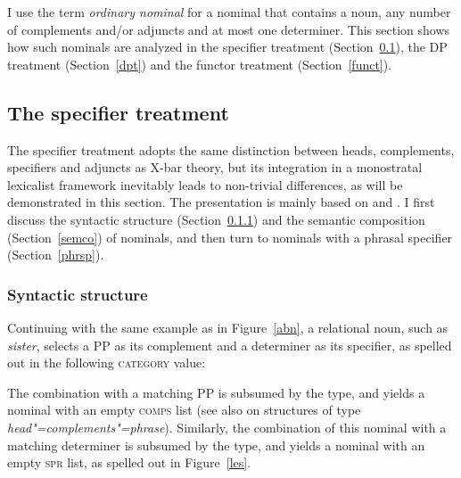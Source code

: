 \documentclass[output=paper,biblatex,babelshorthands,newtxmath,draftmode,colorlinks,citecolor=brown]{langscibook}
\begin{document}
I use the term \emph{ordinary nominal} for a nominal that contains a noun, 
any number of complements and/or adjuncts and at most one determiner. 
This section shows how such nominals are analyzed in the 
specifier treatment (Section~\ref{spect}), the DP treatment (Section~\ref{dpt}) and 
the functor treatment (Section~\ref{funct}). 

    
\subsection{The specifier treatment} 
\label{spect}\label{np:sec-specifier-analysis}


The specifier treatment adopts the same distinction between heads, complements, 
specifiers and adjuncts as X-bar theory, but its integration 
in a monostratal lexicalist framework inevitably leads to non-trivial differences,
as will be demonstrated in this section. 
The presentation is mainly based on \citet{ps2} and \citet{GS00}. 
I first discuss the syntactic structure (Section~\ref{syns}) and the semantic composition (Section~\ref{semco}) 
of nominals, and then turn to nominals with a phrasal specifier (Section~\ref{phrsp}). 


\subsubsection{Syntactic structure}
\label{syns} 

Continuing with the same example as in Figure~\ref{abn}, 
a relational noun, such as \emph{sister}, selects a PP as its complement 
and a determiner as its specifier, as spelled out in 
the following \textsc{category} value:  

\begin{exe} 
\ex\label{n}
\end{exe}

\noindent
The combination with a matching PP
is subsumed by the  type, 
and yields a nominal with an empty \textsc{comps} list (see also
 on 
structures of type \emph{head"=complements"=phrase}).  
Similarly, the combination of this nominal with a matching determiner
is subsumed by the  type,
and yields a nominal with an empty \textsc{spr} list, as spelled out in Figure~\ref{les}. 
\end{document}
